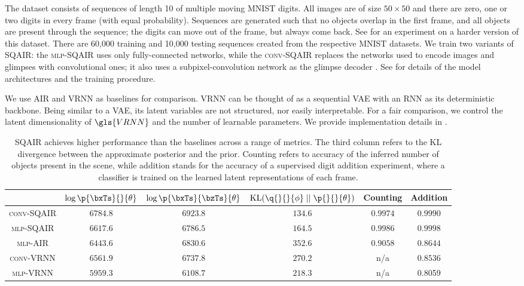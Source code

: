 The dataset consists of sequences of length 10 of multiple moving \gls{MNIST} digits. All images are of size $50 \times 50$ and there are zero, one or two digits in every frame (with equal probability).
Sequences are generated such that no objects overlap in the first frame, and all objects are present through the sequence; the digits can move out of the frame, but always come back.
See  for an experiment on a harder version of this dataset.
There are 60,000 training and 10,000 testing sequences created from the respective \gls{MNIST} datasets.
We train two variants of \gls{SQAIR}: the \textsc{mlp}-\gls{SQAIR} uses only fully-connected networks, while the \textsc{conv}-\gls{SQAIR} replaces the networks used to encode images and glimpses with convolutional ones; it also uses a subpixel-convolution network as the glimpse decoder \citep{shi2016subpixel}.
See  for details of the model architectures and the training procedure.

We use \gls{AIR} and \gls{VRNN} \citep{Chung2015} as baselines for comparison.  \gls{VRNN} can be thought of as a sequential \gls{VAE} with an \gls{RNN} as its deterministic backbone. Being similar to a \gls{VAE}, its latent variables are not structured, nor easily interpretable. For a fair comparison, we control the latent dimensionality of $\gls{VRNN}$ and the number of learnable parameters. We provide implementation details in .

\begin{table}
    \centering
    \begin{tabular}{c|c|c|c|c|c}
                         & $\log \p{\bxTs}{}{\theta}$ & $\log \p{\bxTs}{\bzTs}{\theta}$  & $\kl{\q{}{}{\phi}}{\p{}{}{\theta}}$ & Counting & Addition\\
                         \hline
        \textsc{conv}-\gls{SQAIR} & $\bm{6784.8}$ & $\bm{6923.8}$ & $\bm{134.6}$ & $0.9974$ & $0.9990$ \\
        \textsc{mlp}-\gls{SQAIR}  & $6617.6$      & $6786.5$      & $164.5$      & $\mathbf{0.9986}$ & $\mathbf{0.9998}$ \\
        \textsc{mlp}-\gls{AIR}    & $6443.6$      & $6830.6$      & $352.6$      & $0.9058$ & $0.8644$\\
        \textsc{conv}-\gls{VRNN}  & $6561.9$      & $6737.8$      & $270.2$      & n/a & $0.8536$\\
        \textsc{mlp}-\gls{VRNN}   & $5959.3$      & $6108.7$      & $218.3$      & n/a  & 0.8059 \\
    \end{tabular}
    \vspace{5pt}
    \caption{\gls{SQAIR} achieves higher performance than the baselines across a range of metrics. The third column refers to the \gls{KL} divergence between the approximate posterior and the prior. Counting refers to accuracy of the inferred number of objects present in the scene, while addition stands for the accuracy of a supervised digit addition experiment, where a classifier is trained on the learned latent representations of each frame.}
    \label{tab:quant}
\end{table}


